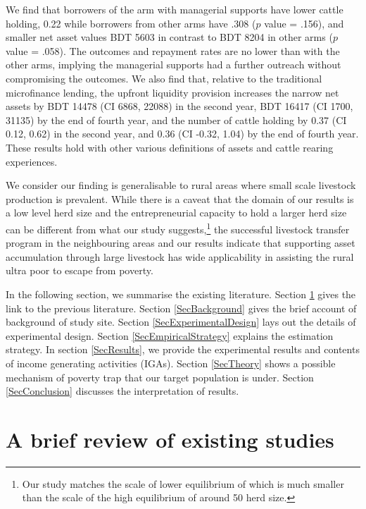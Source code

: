 	We find that borrowers of the arm with managerial supports have lower cattle holding, 0.22 while borrowers from other arms have .308 ($p$ value = .156), and smaller net asset values BDT 5603 in contrast to BDT 8204 in other arms ($p$ value = .058). The outcomes and repayment rates are no lower than with the other arms, implying the managerial supports had a further outreach without compromising the outcomes. We also find that, relative to the traditional microfinance lending, the upfront liquidity provision increases the narrow net assets by BDT 
	14478 
	(CI 6868, 22088) in the second year, 
	BDT 16417 
	(CI 1700, 31135) by the end of fourth year, 
	and the number of cattle holding by 0.37 
	(CI 0.12, 0.62) in the second year, and 
	0.36 
	(CI -0.32, 1.04) by the end of fourth year. These results hold with other various definitions of assets and cattle rearing experiences.
	
	We consider our finding is generalisable to rural areas where small scale livestock production is prevalent. While there is a caveat that the domain of our results is a low level herd size and the entrepreneurial capacity to hold a larger herd size can be different from what our study suggests,\footnote{Our study matches the scale of lower equilibrium of \citet{Lybbertetal2004} which is much smaller than the scale of the high equilibrium of around 50 herd size. } the successful livestock transfer program in the neighbouring areas \citep{BandieraBRAC2017, Balboni2020} and our results indicate that supporting asset accumulation through large livestock has wide applicability in assisting the rural ultra poor to escape from poverty.


	In the following section, we summarise the existing literature. Section \ref{SecExistingStudies} gives the link to the previous literature. Section \ref{SecBackground} gives the brief account of background of study site. Section \ref{SecExperimentalDesign} lays out the details of experimental design. Section \ref{SecEmpiricalStrategy} explains the estimation strategy. In section \ref{SecResults}, we provide the experimental results and contents of income generating activities (IGAs). Section \ref{SecTheory} shows a possible mechanism of poverty trap that our target population is under. Section \ref{SecConclusion} discusses the interpretation of results.

\section{A brief review of existing studies}
\label{SecExistingStudies}

